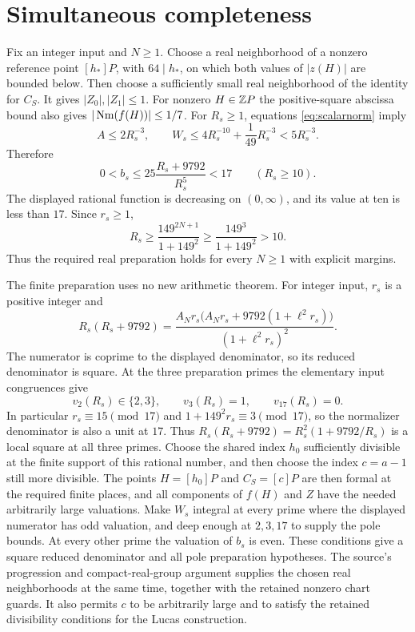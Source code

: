 \documentclass[11pt,a4paper]{article}
\begin{document}
\section{Simultaneous completeness}
Fix an integer input and $N\ge1$. Choose a real neighborhood of a
nonzero reference point $[h_*]P$, with $64\mid h_*$, on which
both values of $|z(H)|$ are bounded below. Then choose a sufficiently
small real neighborhood of the identity for $C_S$. It gives
$|Z_0|,|Z_1|\le1$. For nonzero $H\in\mathbb Z P$ the positive-square
abscissa bound also gives $|\operatorname{Nm}(f(H))|\le1/7$.
For $R_s\ge1$, equations \eqref{eq:scalarnorm} imply
\[
 A\le2R_s^{-3},\qquad
 W_s\le4R_s^{-10}+\frac1{49}R_s^{-3}<5R_s^{-3}.
\]
Therefore
\[
 0<b_s\le25\frac{R_s+9792}{R_s^5}<17\qquad(R_s\ge10).
\]
The displayed rational function is decreasing on $(0,\infty)$, and
its value at ten is less than $17$. Since $r_s\ge1$,
\[
 R_s\ge\frac{149^{2N+1}}{1+149^2}
       \ge\frac{149^3}{1+149^2}>10.
\]
Thus the required real preparation holds for every $N\ge1$ with
explicit margins.

The finite preparation uses no new arithmetic theorem. For integer
input, $r_s$ is a positive integer and
\[
 R_s(R_s+9792)=
 \frac{A_Nr_s\bigl(A_Nr_s+9792(1+\ell^2r_s)\bigr)}
                    {(1+\ell^2r_s)^2}.
\]
The numerator is coprime to the displayed denominator, so its reduced
denominator is square. At the three preparation primes the elementary
input congruences give
\[
 v_2(R_s)\in\{2,3\},\qquad v_3(R_s)=1,
                       \qquad v_{17}(R_s)=0.
\]
In particular $r_s\equiv15\pmod{17}$ and
$1+149^2r_s\equiv3\pmod{17}$, so the normalizer denominator is
also a unit at $17$. Thus
$R_s(R_s+9792)=R_s^2(1+9792/R_s)$ is a local square at all three primes.
Choose the shared index $h_0$ sufficiently divisible at the finite
support of this rational number, and then choose the index
$c=a-1$ still more divisible. The points $H=[h_0]P$ and $C_S=[c]P$
are then formal at the required finite places, and all components of
$f(H)$ and $Z$ have the needed arbitrarily large valuations. Make
$W_s$ integral at every prime where the displayed numerator has odd
valuation, and deep enough at $2,3,17$ to supply the pole bounds.
At every other prime the valuation of $b_s$ is even. These conditions
give a square reduced denominator and all pole preparation hypotheses.
The source's progression and compact-real-group argument supplies the
chosen real neighborhoods at the same time, together with the retained
nonzero chart guards. It also permits $c$ to be arbitrarily large and
to satisfy the retained divisibility conditions for the Lucas construction.
\end{document}
